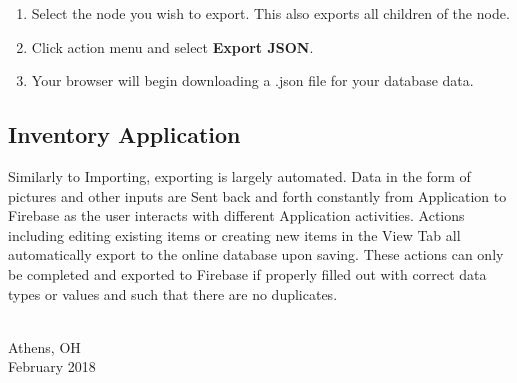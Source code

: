 \begin{enumerate}
	\item Select the node you wish to export. This also exports all children of the node.
	\item Click action menu and select \textbf{Export JSON}.
	\item Your browser will begin downloading a .json file for your database data.
\end{enumerate}

\subsection{Inventory Application}

Similarly to Importing, exporting is largely automated. Data in the form of pictures and other inputs are Sent back and forth constantly from Application to Firebase as the user interacts with different Application activities. Actions including editing existing items or creating new items in the View Tab all automatically export to the online database upon saving. These actions can only be completed and exported to Firebase if properly filled out with correct data types or values and such that there are no duplicates.      

\vspace*{\fill}
{ \\ Athens, OH \\ February 2018\par}
